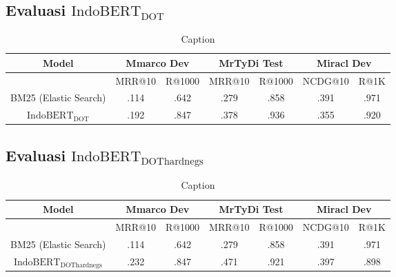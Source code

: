 \subsection{Evaluasi $\text{IndoBERT}_{\text{DOT}}$}
\label{sec:resultindobertdot}

\begin{table}
    \centering
    \caption{Caption}
    \label{tab:indobertdot}
    \begin{tabular}{|c|cc|cc|cc|} \hline
        Model                             & \multicolumn{2}{|c|}{Mmarco Dev} &
        \multicolumn{2}{|c|}{MrTyDi Test} & \multicolumn{2}{|c|}{Miracl Dev}                                             \\ \hline
                                          & MRR@10                           & R@1000 & MRR@10 & R@1000 & NCDG@10 & R@1K \\ \hline
        BM25 (Elastic Search)             & .114                             & .642   & .279   & .858   & .391    & .971 \\ \hline
        $\text{IndoBERT}_{\text{DOT}}$    & .192                             & .847   & .378   & .936   & .355    & .920 \\ \hline
    \end{tabular}

\end{table}

\subsection{Evaluasi $\text{IndoBERT}_{\text{DOThardnegs}}$}
\label{sec:resultindobertdothardnegs}

\begin{table}
    \centering
    \caption{Caption}
    \label{tab:indobertdothardnegs}
    \begin{tabular}{|c|cc|cc|cc|} \hline
        Model                                  & \multicolumn{2}{|c|}{Mmarco Dev} &
        \multicolumn{2}{|c|}{MrTyDi Test}      & \multicolumn{2}{|c|}{Miracl Dev}                                             \\ \hline
                                               & MRR@10                           & R@1000 & MRR@10 & R@1000 & NCDG@10 & R@1K \\ \hline
        BM25 (Elastic Search)                  & .114                             & .642   & .279   & .858   & .391    & .971 \\ \hline
        $\text{IndoBERT}_{\text{DOThardnegs}}$ & .232                             & .847   & .471   & .921   & .397    & .898 \\ \hline
    \end{tabular}
\end{table}


